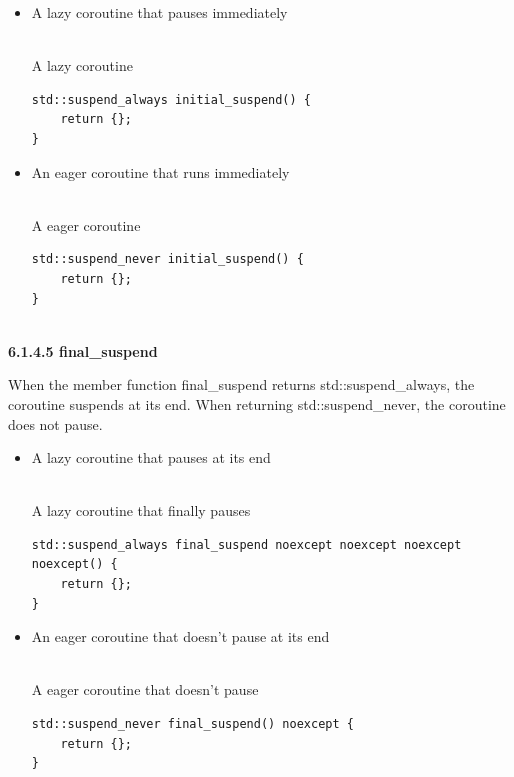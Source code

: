 \begin{itemize}
\item 
A lazy coroutine that pauses immediately

\hspace*{\fill} \\ %
\noindent
A lazy coroutine
\begin{lstlisting}[style=styleCXX]
std::suspend_always initial_suspend() {
	return {};
}
\end{lstlisting}

\item 
An eager coroutine that runs immediately

\hspace*{\fill} \\ %
\noindent
A eager coroutine
\begin{lstlisting}[style=styleCXX]
std::suspend_never initial_suspend() {
	return {};
}
\end{lstlisting}
\end{itemize}


\hspace*{\fill} \\ %
\noindent
\textbf{6.1.4.5\hspace{0.2cm} final\_suspend}

When the member function final\_suspend returns std::suspend\_always, the coroutine suspends at its end. When returning std::suspend\_never, the coroutine does not pause.

\begin{itemize}
\item 
A lazy coroutine that pauses at its end

\hspace*{\fill} \\ %
\noindent
A lazy coroutine that finally pauses
\begin{lstlisting}[style=styleCXX]
std::suspend_always final_suspend noexcept noexcept noexcept noexcept() {
	return {};
}
\end{lstlisting}

\item 
An eager coroutine that doesn’t pause at its end

\hspace*{\fill} \\ %
\noindent
A eager coroutine that doesn’t pause
\begin{lstlisting}[style=styleCXX]
std::suspend_never final_suspend() noexcept {
	return {};
}
\end{lstlisting}
\end{itemize}

